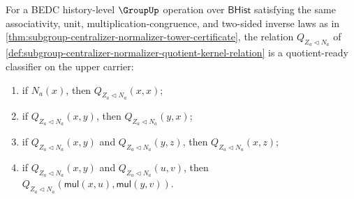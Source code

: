 \begin{theorem}
\label{thm:subgroup-centralizer-normalizer-quotient-kernel-congruence}
For a BEDC history-level $\GroupUp$ operation over $\mathsf{BHist}$ satisfying
the same associativity, unit, multiplication-congruence, and two-sided inverse
laws as in
\autoref{thm:subgroup-centralizer-normalizer-tower-certificate}, the relation
$Q_{Z_a\triangleleft N_a}$ of
\autoref{def:subgroup-centralizer-normalizer-quotient-kernel-relation} is a
quotient-ready classifier on the upper carrier:
\begin{enumerate}
\item if $N_a(x)$, then $Q_{Z_a\triangleleft N_a}(x,x)$;
\item if $Q_{Z_a\triangleleft N_a}(x,y)$, then
$Q_{Z_a\triangleleft N_a}(y,x)$;
\item if $Q_{Z_a\triangleleft N_a}(x,y)$ and
$Q_{Z_a\triangleleft N_a}(y,z)$, then
$Q_{Z_a\triangleleft N_a}(x,z)$;
\item if $Q_{Z_a\triangleleft N_a}(x,y)$ and
$Q_{Z_a\triangleleft N_a}(u,v)$, then
$Q_{Z_a\triangleleft N_a}(\mathsf{mul}(x,u),\mathsf{mul}(y,v))$.
\end{enumerate}
\end{theorem}
